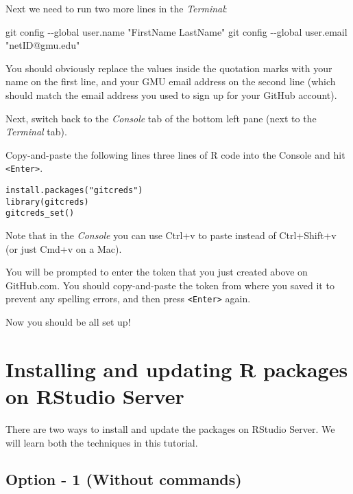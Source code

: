 \documentclass[
]{book}
\newenvironment{Shaded}{\begin{snugshade}}{\end{snugshade}}
\newcommand{\AttributeTok}[1]{\textcolor[rgb]{0.77,0.63,0.00}{#1}}
\newcommand{\FunctionTok}[1]{\textcolor[rgb]{0.00,0.00,0.00}{#1}}
\newcommand{\NormalTok}[1]{#1}
\newcommand{\StringTok}[1]{\textcolor[rgb]{0.31,0.60,0.02}{#1}}
\begin{document}
Next we need to run two more lines in the \emph{Terminal}:

\begin{Shaded}
\begin{Highlighting}[]
\FunctionTok{git}\NormalTok{ config }\AttributeTok{{-}{-}global}\NormalTok{ user.name }\StringTok{"FirstName LastName"}
\FunctionTok{git}\NormalTok{ config }\AttributeTok{{-}{-}global}\NormalTok{ user.email }\StringTok{"netID@gmu.edu"}
\end{Highlighting}
\end{Shaded}

You should obviously replace the values inside the quotation marks with your name on the first line, and your GMU email address on the second line (which should match the email address you used to sign up for your GitHub account).

Next, switch back to the \emph{Console} tab of the bottom left pane (next to the \emph{Terminal} tab).

Copy-and-paste the following lines three lines of R code into the Console and hit \texttt{\textless{}Enter\textgreater{}}.

\begin{verbatim}
install.packages("gitcreds")
library(gitcreds)
gitcreds_set()
\end{verbatim}

Note that in the \emph{Console} you can use Ctrl+v to paste instead of Ctrl+Shift+v (or just Cmd+v on a Mac).

You will be prompted to enter the token that you just created above on GitHub.com. You should copy-and-paste the token from where you saved it to prevent any spelling errors, and then press \texttt{\textless{}Enter\textgreater{}} again.

Now you should be all set up!

\hypertarget{installing-and-updating-r-packages-on-rstudio-server}{%
\section{Installing and updating R packages on RStudio Server}\label{installing-and-updating-r-packages-on-rstudio-server}}

There are two ways to install and update the packages on RStudio Server. We will learn both the techniques in this tutorial.

\hypertarget{option---1-without-commands}{%
\subsection{Option - 1 (Without commands)}\label{option---1-without-commands}}
\end{document}

